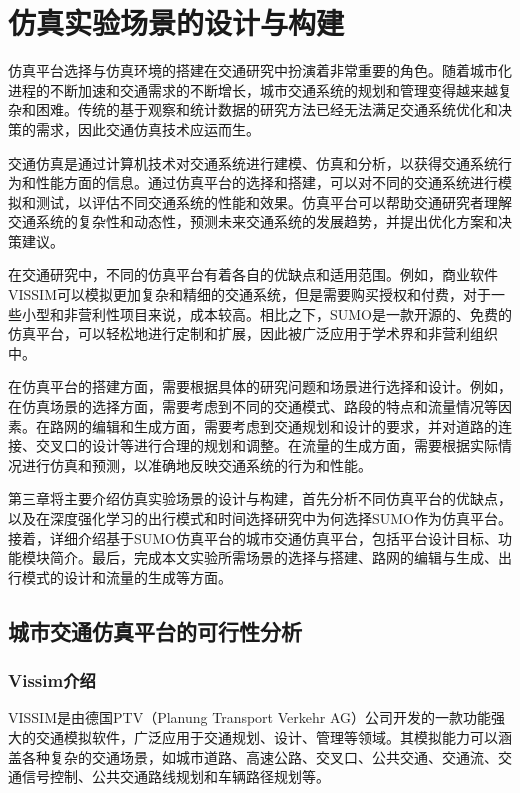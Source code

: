 \chapter{仿真实验场景的设计与构建}

仿真平台选择与仿真环境的搭建在交通研究中扮演着非常重要的角色。随着城市化进程的不断加速和交通需求的不断增长，城市交通系统的规划和管理变得越来越复杂和困难。传统的基于观察和统计数据的研究方法已经无法满足交通系统优化和决策的需求，因此交通仿真技术应运而生。

交通仿真是通过计算机技术对交通系统进行建模、仿真和分析，以获得交通系统行为和性能方面的信息。通过仿真平台的选择和搭建，可以对不同的交通系统进行模拟和测试，以评估不同交通系统的性能和效果。仿真平台可以帮助交通研究者理解交通系统的复杂性和动态性，预测未来交通系统的发展趋势，并提出优化方案和决策建议。

在交通研究中，不同的仿真平台有着各自的优缺点和适用范围。例如，商业软件VISSIM可以模拟更加复杂和精细的交通系统，但是需要购买授权和付费，对于一些小型和非营利性项目来说，成本较高。相比之下，SUMO是一款开源的、免费的仿真平台，可以轻松地进行定制和扩展，因此被广泛应用于学术界和非营利组织中。

在仿真平台的搭建方面，需要根据具体的研究问题和场景进行选择和设计。例如，在仿真场景的选择方面，需要考虑到不同的交通模式、路段的特点和流量情况等因素。在路网的编辑和生成方面，需要考虑到交通规划和设计的要求，并对道路的连接、交叉口的设计等进行合理的规划和调整。在流量的生成方面，需要根据实际情况进行仿真和预测，以准确地反映交通系统的行为和性能。

第三章将主要介绍仿真实验场景的设计与构建，首先分析不同仿真平台的优缺点，以及在深度强化学习的出行模式和时间选择研究中为何选择SUMO作为仿真平台。接着，详细介绍基于SUMO仿真平台的城市交通仿真平台，包括平台设计目标、功能模块简介。最后，完成本文实验所需场景的选择与搭建、路网的编辑与生成、出行模式的设计和流量的生成等方面。

\section{城市交通仿真平台的可行性分析}

\subsection{Vissim介绍}

VISSIM是由德国PTV（Planung Transport Verkehr AG）公司开发的一款功能强大的交通模拟软件，广泛应用于交通规划、设计、管理等领域。其模拟能力可以涵盖各种复杂的交通场景，如城市道路、高速公路、交叉口、公共交通、交通流、交通信号控制、公共交通路线规划和车辆路径规划等。

